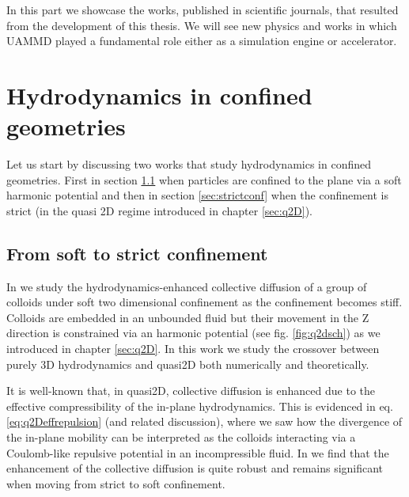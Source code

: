 \documentclass[ twoside,openright,titlepage,numbers=noenddot,%
headinclude,footinclude,cleardoublepage=empty,abstract=on,
BCOR=5mm,paper=a4,fontsize=11pt, dvipsnames
]{scrreprt}
\newcommand{\uammd}{\gls{UAMMD}\xspace}
\begin{document}
In this part we showcase the works, published in scientific journals, that resulted from the development of this thesis. We will see new physics and works in which \uammd played a fundamental role either as a simulation engine or accelerator.

\chapter{Hydrodynamics in confined geometries}

Let us start by discussing two works that study hydrodynamics in confined geometries. First in section \ref{sec:softconf} when particles are confined to the plane via a soft harmonic potential and then in section \ref{sec:strictconf} when the confinement is strict (in the quasi 2D regime introduced in chapter \ref{sec:q2D}).

\section{From soft to strict confinement}\label{sec:softconf}
 In \cite{Pelaez2017} we study the hydrodynamics-enhanced collective diffusion of a group of colloids under soft two dimensional confinement as the confinement becomes stiff. Colloids are embedded in an unbounded fluid but their movement in the Z direction is constrained via an harmonic potential (see fig. \ref{fig:q2dsch}) as we introduced in chapter \ref{sec:q2D}. In this work we study the crossover between purely 3D hydrodynamics and quasi2D both numerically and theoretically.

  It is well-known that, in quasi2D, collective diffusion is enhanced due to the effective compressibility of the in-plane hydrodynamics. This is evidenced in eq. \eqref{eq:q2Deffrepulsion} (and related discussion), where we saw how the divergence of the in-plane mobility can be interpreted as the colloids interacting via a Coulomb-like repulsive potential in an incompressible fluid. In \cite{Pelaez2017} we find that the enhancement of the collective diffusion is quite robust and remains significant when moving from strict to soft confinement.
\end{document}
